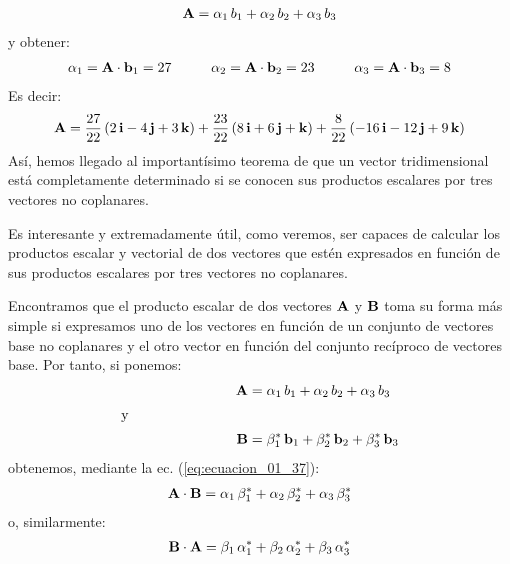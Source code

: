 \begin{align*}
    \vb{A} = \alpha_{1} \, b_{1} + \alpha_{2} \, b_{2} + \alpha_{3} \, b_{3}
\end{align*}
y obtener:
\begin{align*}
    \alpha_{1} = \vb{A} \cdot \vb{b}_{1} = 27 \hspace{1cm} \alpha_{2} = \vb{A} \cdot \vb{b}_{2} = 23 \hspace{1cm} \alpha_{3} = \vb{A} \cdot \vb{b}_{3} = 8
\end{align*}
Es decir:
\begin{align*}
    \vb{A} = \dfrac{27}{22} \left( 2 \, \vb{i} - 4 \, \vb{j} + 3 \, \vb{k} \right) + \dfrac{23}{22} \left( 8 \, \vb{i} + 6 \, \vb{j} + \vb{k} \right) + \dfrac{8}{22} \left( -16 \, \vb{i} - 12 \, \vb{j} + 9 \, \vb{k} \right)
\end{align*}
Así, hemos llegado al importantísimo teorema de que un vector tridimensional está completamente determinado si se conocen sus productos escalares por tres vectores no coplanares.
\par
Es interesante y extremadamente útil, como veremos, ser capaces de calcular los productos escalar y vectorial de dos vectores que estén expresados en función de sus productos escalares por tres vectores no coplanares.
\par
Encontramos que el producto escalar de dos vectores $\vb{A}$ y $\vb{B}$ toma su forma más simple si expresamos uno de los vectores en función de un conjunto de vectores base no coplanares y el otro vector en función del conjunto recíproco de vectores base. Por tanto, si ponemos:
\begin{align}
\begin{aligned}
    \vb{A} &= \alpha_{1} \, b_{1} + \alpha_{2} \, b_{2} + \alpha_{3} \, b_{3} \\[0.25em]
    \text{y} \hspace{3cm} &{} \\[0.25em]
    \vb{B} &= \beta_{1}^{*} \, \vb{b}_{1} + \beta_{2}^{*} \, \vb{b}_{2} + \beta_{3}^{*} \, \vb{b}_{3}
    \end{aligned}
    \label{eq:ecuacion_01_45}
\end{align}
obtenemos, mediante la ec. (\ref{eq:ecuacion_01_37}):
\begin{align}
    \vb{A} \cdot \vb{B} = \alpha_{1} \, \beta_{1}^{*} + \alpha_{2} \, \beta_{2}^{*} + \alpha_{3} \, \beta_{3}^{*}
    \label{eq:ecuacion_01_46}
\end{align}
o, similarmente:
\begin{align}
    \vb{B} \cdot \vb{A} = \beta_{1} \, \alpha_{1}^{*} + \beta_{2} \, \alpha_{2}^{*} + \beta_{3} \, \alpha_{3}^{*}
    \label{eq:ecuacion_01_47}
\end{align}
